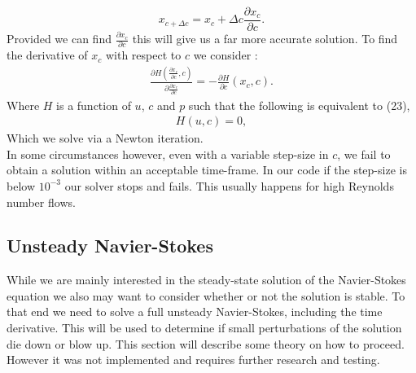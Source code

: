 \documentclass[11pt,twoside,a4paper]{article}
\begin{document}
$$
x_{c+\Delta c} = x_c + \Delta c \frac{\partial x_c}{\partial c} .
$$
Provided we can find $\frac{\partial x_c}{\partial c}$ this will give us a far more accurate solution.
To find the derivative of $x_c$ with respect to $c$ we consider :\\
\begin{align}
\frac{\partial H (\frac{\partial x_c}{\partial c},c)}{\partial \frac{\partial x_c}{\partial c}}  = - \frac{\partial H}{\partial c}(x_c,c) .
\end{align}
Where $H$ is a function of $u$, $c$ and $p$ such that the following is equivalent to (23),
\begin{align*}
H(u,c) = 0 ,
\end{align*}
Which we solve via a Newton iteration.\\
In some circumstances however, even with a variable step-size in $c$, we fail to obtain a solution within an acceptable time-frame. In our code if the step-size is below $10^{-3}$ our solver stops and fails. This usually happens for high Reynolds number flows.

\subsection{Unsteady Navier-Stokes}

While we are mainly interested in the steady-state solution of the Navier-Stokes equation we also may want to consider whether or not the solution is stable. To that end we need to solve a full unsteady Navier-Stokes, including the time derivative. This will be used to determine if small perturbations of the solution die down or blow up. This section will describe some theory on how to proceed. However it was not implemented and requires further research and testing.
\end{document}
